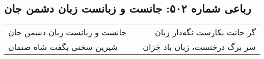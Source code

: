 \begin{center}
\section*{رباعی شماره ۵۰۲: جانست و زبانست زبان دشمن جان}
\label{sec:sh502}
\begin{longtable}{l p{0.5cm} r}
جانست و زبانست زبان دشمن جان
&&
گر جانت بکارست نگه‌دار زبان
\\
شیرین سخنی بگفت شاه صنمان
&&
سر برگ درختست، زبان باد خزان
\\
\end{longtable}
\end{center}
